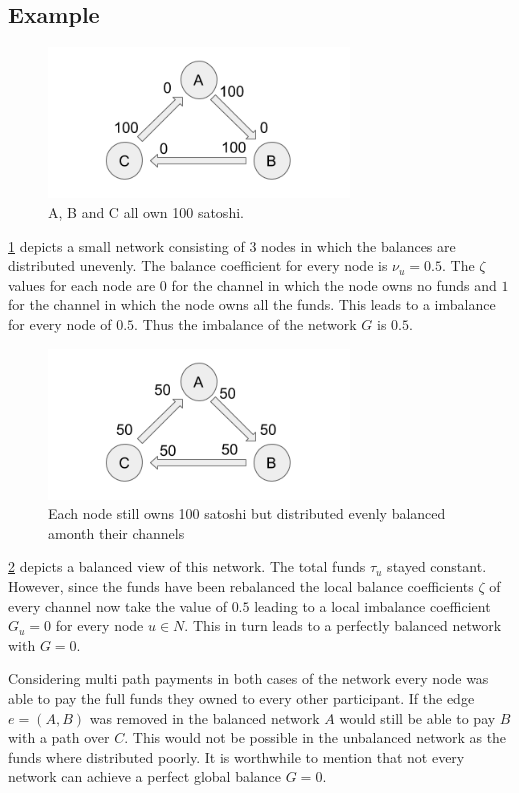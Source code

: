 \documentclass[a4paper]{paper}
\begin{document}
\subsection{Example}
\label{sec:example}

\begin{figure}
 \centering
 \includegraphics[width=8cm]{img/evenUnbalanced.png}
 \caption{A, B and C all own 100 satoshi.}
 \label{fig:evenUnbalanced}
\end{figure}

\cref{fig:evenUnbalanced} depicts a small network consisting of $3$ nodes in which the balances are distributed unevenly.
The balance coefficient for every node is $\nu_u=0.5$.
The $\zeta$ values for each node are $0$ for the channel in which the node owns no funds and $1$ for the channel in which the node owns all the funds.
This leads to a imbalance for every node of $0.5$.
Thus the imbalance of the network $G$ is $0.5$.

\begin{figure}
 \centering
 \includegraphics[width=8cm]{img/evenBalanced.png}
 \caption{Each node still owns 100 satoshi but distributed evenly balanced amonth their channels}
 \label{fig:evenBalanced}
\end{figure}

\cref{fig:evenBalanced} depicts a balanced view of this network.
The total funds $\tau_u$ stayed constant.
However, since the funds have been rebalanced the local balance coefficients $\zeta$ of every channel now take the value of $0.5$ leading to a local imbalance coefficient $G_u=0$ for every node $u\in N$.
This in turn leads to a perfectly balanced network with $G=0$.

Considering multi path payments in both cases of the network every node was able to pay the full funds they owned to every other participant.
If the edge $e=(A,B)$ was removed in the balanced network $A$ would still be able to pay $B$ with a path over $C$.
This would not be possible in the unbalanced network as the funds where distributed poorly.
It is worthwhile to mention that not every network can achieve a perfect global balance $G=0$.
\end{document}
